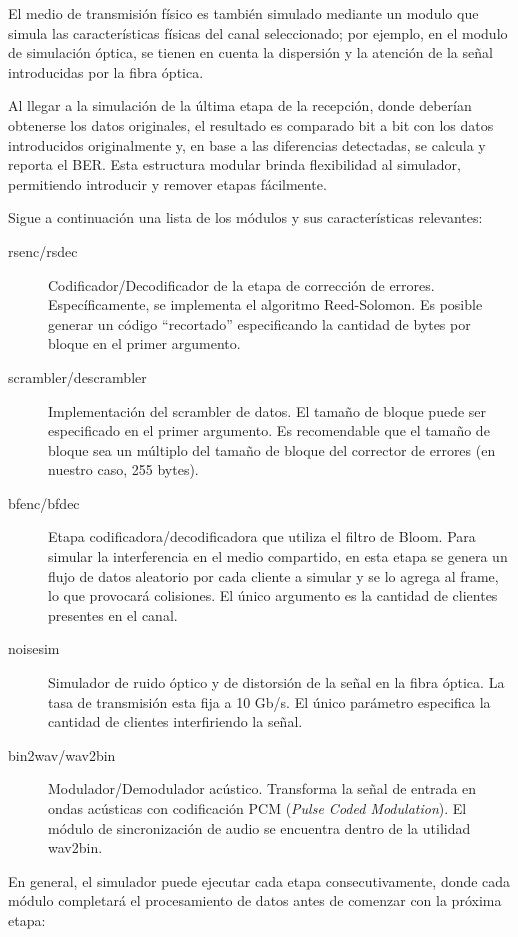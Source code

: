 El medio de transmisión físico es también simulado mediante un modulo que simula las características físicas del canal seleccionado; por ejemplo, en el modulo de simulación óptica, se tienen en cuenta la dispersión y la atención de la señal introducidas por la fibra óptica.

Al llegar a la simulación de la última etapa de la recepción, donde deberían obtenerse los datos originales, el resultado es comparado bit a bit con los datos introducidos originalmente y, en base a las diferencias detectadas, se calcula y reporta el BER. Esta estructura modular brinda flexibilidad al simulador, permitiendo introducir y remover etapas fácilmente.

Sigue a continuación una lista de los módulos y sus características relevantes:

\begin{description} 
 \item[rsenc/rsdec] Codificador/Decodificador de la etapa de corrección de errores. Específicamente, se implementa el algoritmo Reed-Solomon. Es posible generar un código ``recortado'' especificando la cantidad de bytes por bloque en el primer argumento.
 \item[scrambler/descrambler] Implementación del scrambler de datos. El tamaño de bloque puede ser especificado en el primer argumento. Es recomendable que el tamaño de bloque sea un múltiplo del tamaño de bloque del corrector de errores (en nuestro caso, 255 bytes).
 \item[bfenc/bfdec] Etapa codificadora/decodificadora que utiliza el filtro de Bloom. Para simular la interferencia en el medio compartido, en esta etapa se genera un flujo de datos aleatorio por cada cliente a simular y se lo agrega al frame, lo que provocará colisiones. El único argumento es la cantidad de clientes presentes en el canal.
 \item[noisesim] Simulador de ruido óptico y de distorsión de la señal en la fibra óptica. La tasa de transmisión esta fija a 10 Gb/s. El único parámetro especifica la cantidad de clientes interfiriendo la señal.
 \item[bin2wav/wav2bin] Modulador/Demodulador acústico. Transforma la señal de entrada en ondas acústicas con codificación PCM (\textit{Pulse Coded Modulation}). El módulo de sincronización de audio se encuentra dentro de la utilidad wav2bin.
\end{description}

En general, el simulador puede ejecutar cada etapa consecutivamente, donde cada módulo completará el procesamiento de datos antes de comenzar con la próxima etapa:

